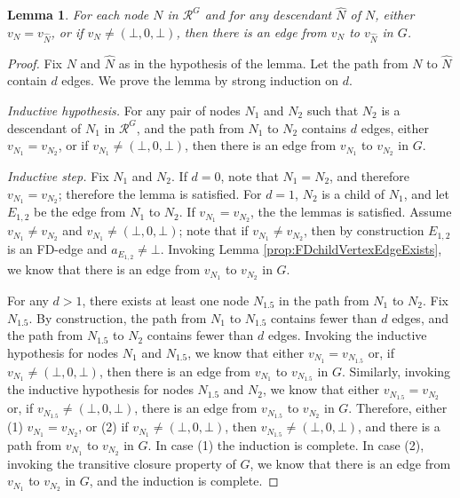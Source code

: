 \documentclass[11pt]{article}
\numberwithin{theorem}{section}
\newtheorem{lemma}[theorem]{Lemma}
\begin{document}
\begin{lemma}\label{lem:descendantVertexTagEdge}
For each node $N$ in $\mathcal{R}^{G}$ and for any descendant $\hat{N}$ of $N$, either $v_{N} = v_{\hat{N}}$, or if $v_N \neq (\bot, 0, \bot)$, then there is an edge from $v_N$ to $v_{\hat{N}}$ in $G$.
\end{lemma}
\begin{proof}
Fix $N$ and $\hat{N}$ as in the hypothesis of the lemma. Let the path from $N$ to $\hat{N}$ contain $d$ edges. We prove the lemma by strong induction on $d$.

\emph{Inductive hypothesis.} For any pair of nodes $N_1$ and $N_2$ such that $N_2$ is a descendant of $N_1$ in $\mathcal{R}^G$, and the path from $N_1$ to $N_2$ contains $d$ edges,  either $v_{N_1} = v_{N_2}$, or if $v_{N_1} \neq (\bot, 0, \bot)$, then  there is an edge from $v_{N_1}$ to $v_{N_2}$ in $G$.

\emph{Inductive step.} Fix $N_1$ and $N_2$. If $d=0$, note that $N_1 = N_2$, and therefore $v_{N_1} = v_{N_2}$; therefore the lemma is satisfied. For $d=1$, $N_2$ is a child of $N_1$, and let $E_{1,2}$ be the edge from $N_1$ to $N_2$. If $v_{N_1} = v_{N_2}$, the the lemmas is satisfied. Assume $v_{N_1} \neq v_{N_2}$ and $v_{N_1} \neq (\bot, 0, \bot)$; note that if $v_{N_1} \neq v_{N_2}$, then by construction $E_{1,2}$ is an FD-edge and $a_{E_{1,2}} \neq \bot$. Invoking Lemma \ref{prop:FDchildVertexEdgeExists}, we know that there is an edge from $v_{N_1}$ to $v_{N_2}$ in $G$.


For any $d > 1$, there exists at least one node $N_{1.5}$ in the path from $N_1$ to $N_2$. Fix $N_{1.5}$. By construction, the path from $N_1$ to $N_{1.5}$ contains fewer than $d$ edges, and the path from $N_{1.5}$ to $N_2$ contains fewer than $d$ edges. Invoking the inductive hypothesis for nodes $N_1$ and $N_{1.5}$, we know that either $v_{N_1} = v_{N_{1.5}}$ or, if $v_{N_1}  \neq (\bot, 0, \bot)$, then there is an edge from $v_{N_1}$ to $v_{N_{1.5}}$ in $G$. Similarly, invoking the inductive hypothesis for nodes $N_{1.5}$ and $N_2$, we know that either $v_{N_{1.5}} = v_{N_2}$ or, if $v_{N_{1.5}}  \neq (\bot, 0, \bot)$,  there is an edge from $v_{N_{1.5}}$ to $v_{N_2}$ in $G$. Therefore, either (1) $v_{N_1} = v_{N_2}$, or (2) if $v_{N_1} \neq (\bot, 0, \bot)$, then $v_{N_{1.5}} \neq (\bot, 0, \bot)$, and there is a path from  $v_{N_1}$ to $v_{N_2}$ in $G$. In case (1) the induction is complete. In case (2), invoking the transitive closure property of $G$, we know that there is an edge from $v_{N_1}$ to $v_{N_2}$ in $G$, and the induction is complete.

\end{proof}
\end{document}

